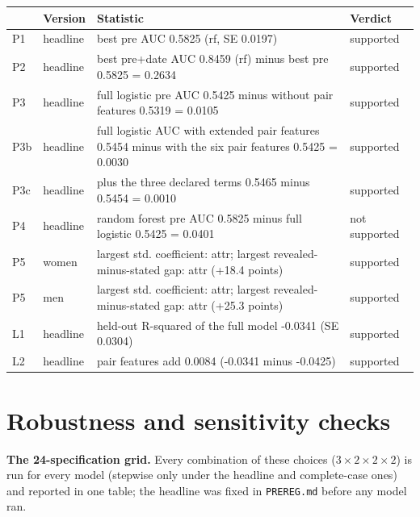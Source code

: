 \documentclass[11pt]{article}
\begin{document}
\footnotesize
\begin{center}
\begin{tabular}{llL{9.6cm}l}
\toprule
\textbf{} & \textbf{Version} & \textbf{Statistic} & \textbf{Verdict} \\
\midrule
P1 & headline & best pre AUC 0.5825 (rf, SE 0.0197) & supported \\
P2 & headline & best pre+date AUC 0.8459 (rf) minus best pre 0.5825 = 0.2634 & supported \\
P3 & headline & full logistic pre AUC 0.5425 minus without pair features 0.5319 = 0.0105 & supported \\
P3b & headline & full logistic AUC with extended pair features 0.5454 minus with the six pair features 0.5425 = 0.0030 & supported \\
P3c & headline & plus the three declared terms 0.5465 minus 0.5454 = 0.0010 & supported \\
P4 & headline & random forest pre AUC 0.5825 minus full logistic 0.5425 = 0.0401 & not supported \\
P5 & women & largest std. coefficient: attr; largest revealed-minus-stated gap: attr (+18.4 points) & supported \\
P5 & men & largest std. coefficient: attr; largest revealed-minus-stated gap: attr (+25.3 points) & supported \\
L1 & headline & held-out R-squared of the full model -0.0341 (SE 0.0304) & supported \\
L2 & headline & pair features add 0.0084 (-0.0341 minus -0.0425) & supported \\
\bottomrule
\end{tabular}
\end{center}
\normalsize

\section{Robustness and sensitivity checks}\label{sec:robust}

\textbf{The 24-specification grid.} Every combination of these choices ($3 \times 2 \times 2 \times 2$) is run for every model (stepwise only under the headline and complete-case ones) and reported in one table; the headline was fixed in \texttt{PREREG.md} before any model ran.
\end{document}
